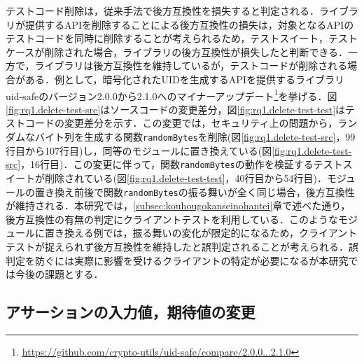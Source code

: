 \documentclass[11pt,dvipdfmx]{jreport}
\begin{document}
テストコード削除は，従来手法で後方互換性を損失すると判定される．ライブラリが提供するAPIを削除することによる後方互換性の損失は，対象となるAPIのテストコードを同時に削除することが考えられるため，テストスイート，テストケースが削除された場合，ライブラリの後方互換性が損失したと判断できる．一方で，ライブラリは後方互換性を維持しているが，テストコードが削除される場合がある．例として，暗号化されたUIDを生成するAPIを提供するライブラリuid-safeのバージョン2.0.0から2.1.0へのマイナーアップデート\footnote{\url{https://github.com/crypto-utils/uid-safe/compare/2.0.0...2.1.0}}を挙げる．図\ref{fig:rq1.delete-test-src}はソースコードの変更差分，図\ref{fig:rq1.delete-test-test}はテストコードの変更差分を示す．この変更では，セキュリティ上の問題から，ランダムなバイト列を生成する関数{\verb|randomBytes|}を削除(図\ref{fig:rq1.delete-test-src}，99行目から107行目)し，同等のモジュールに置き換えている(図\ref{fig:rq1.delete-test-src}，16行目)．この変更に伴って，関数{\verb|randomBytes|}の動作を検証するテストスイートが削除されている(図\ref{fig:rq1.delete-test-test}，40行目から54行目)．モジュールの置き換え前後で関数{\verb|randomBytes|}の振る舞いが全く同じ場合，後方互換性が維持される．本研究では，\ref{subsec:kouhougokanseinohantei}章で述べた通り，後方互換性の有無の判定にクライアントテストを利用している．このようなモジュールに置き換える例では，振る舞いの変化が限定的になるため，クライアントテストが捉えられず後方互換性を維持したと誤判定されることが考えられる．誤判定を防ぐには実際に影響を受けるクライアントの特定が必要になるが本研究では今後の課題とする．

\subsection{アサーションの入力値，期待値の変更}\label{subsec:change-test}
\end{document}
